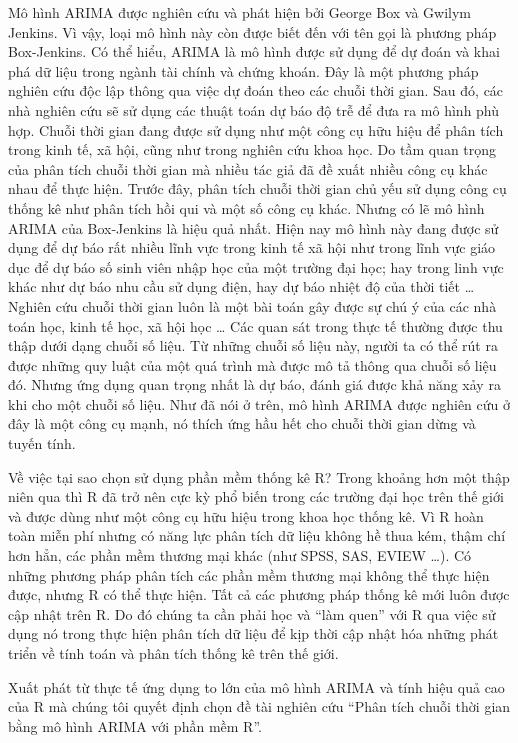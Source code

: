 \documentclass[12pt, a4paper,oneside]{book}
\theoremstyle{definition}
\begin{document}
Mô hình ARIMA được nghiên cứu và phát hiện bởi George Box và Gwilym Jenkins. Vì vậy, loại mô hình này còn được biết đến với tên gọi là phương pháp Box-Jenkins. Có thể hiểu, ARIMA là mô hình được sử dụng để dự đoán và khai phá dữ liệu trong ngành tài chính và chứng khoán. Đây là một phương pháp nghiên cứu độc lập thông qua việc dự đoán theo các chuỗi thời gian. Sau đó, các nhà nghiên cứu sẽ sử dụng các thuật toán dự báo độ trễ để đưa ra mô hình phù hợp. 
Chuỗi thời gian đang được sử dụng như một công cụ hữu hiệu để phân tích trong kinh tế, xã hội, cũng như trong nghiên cứu khoa học. Do tầm quan trọng của phân tích chuỗi thời gian mà nhiều tác giả đã đề xuất nhiều công cụ khác nhau để thực hiện. Trước đây, phân tích chuỗi thời gian chủ yếu sử dụng công cụ thống kê như phân tích hồi qui và một số công cụ khác. Nhưng có lẽ mô hình ARIMA của Box-Jenkins là hiệu quả nhất. Hiện nay mô hình này đang được sử dụng để dự báo rất nhiều lĩnh vực trong kinh tế xã hội như trong lĩnh vực giáo dục để dự báo số sinh viên nhập học của một trường đại học; hay trong linh vực khác như dự báo nhu cầu sử dụng điện, hay dự báo nhiệt độ của thời tiết …
Nghiên cứu chuỗi thời gian luôn là một bài toán gây được sự chú ý của các nhà toán học, kinh tế học, xã hội học … Các quan sát trong thực tế thường được thu thập dưới dạng chuỗi số liệu. Từ những chuỗi số liệu này, người ta có thể rút ra được những quy luật của một quá trình mà được mô tả thông qua chuỗi số liệu đó. Nhưng ứng dụng quan trọng nhất là dự báo, đánh giá được khả năng xảy ra khi cho một chuỗi số liệu.  Như đã nói ở trên, mô hình ARIMA được nghiên cứu ở đây là một công cụ mạnh, nó thích ứng hầu hết cho chuỗi thời gian dừng và tuyến tính.

Về việc tại sao chọn sử dụng phần mềm thống kê R? Trong khoảng hơn một thập niên qua thì R đã trở nên cực kỳ phổ biến trong các trường đại học trên thế giới và được dùng như một công cụ hữu hiệu trong khoa học thống kê. Vì R hoàn toàn miễn phí nhưng có năng lực phân tích dữ liệu không hề thua kém, thậm chí hơn hẳn, các phần mềm thương mại khác (như SPSS, SAS, EVIEW …). Có những phương pháp phân tích các phần mềm thương mại không thể thực hiện được, nhưng R có thể thực hiện. Tất cả các phương pháp thống kê mới luôn được cập nhật trên R. Do đó chúng ta cần phải học và “làm quen” với R qua việc sử dụng nó trong thực hiện phân tích dữ liệu để kịp thời cập nhật hóa những phát triển về tính toán và phân tích thống kê trên thế giới.

Xuất phát từ thực tế ứng dụng to lớn của mô hình ARIMA và tính hiệu quả cao của R mà chúng tôi quyết định chọn đề tài nghiên cứu “Phân tích chuỗi thời gian bằng mô hình ARIMA với phần mềm R”.
\end{document}
